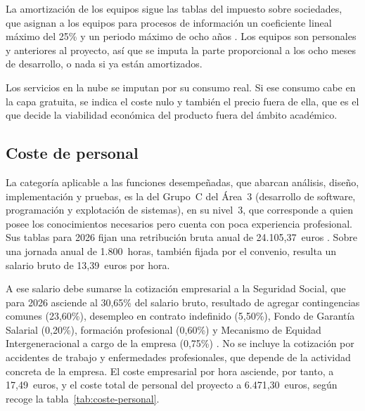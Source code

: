 La amortización de los equipos sigue las tablas del impuesto sobre sociedades, que asignan a los equipos para procesos de información un coeficiente lineal máximo del 25\% y un periodo máximo de ocho años \citep{LIS2014}. Los equipos son personales y anteriores al proyecto, así que se imputa la parte proporcional a los ocho meses de desarrollo, o nada si ya están amortizados.

Los servicios en la nube se imputan por su consumo real. Si ese consumo cabe en la capa gratuita, se indica el coste nulo y también el precio fuera de ella, que es el que decide la viabilidad económica del producto fuera del ámbito académico.

\subsection{Coste de personal}

La categoría aplicable a las funciones desempeñadas, que abarcan análisis, diseño, implementación y pruebas, es la del Grupo~C del Área~3 (desarrollo de software, programación y explotación de sistemas), en su nivel~3, que corresponde a quien posee los conocimientos necesarios pero cuenta con poca experiencia profesional. Sus tablas para 2026 fijan una retribución bruta anual de 24.105,37~euros \citep{ConvenioTIC2025}. Sobre una jornada anual de 1.800~horas, también fijada por el convenio, resulta un salario bruto de 13,39~euros por hora.

A ese salario debe sumarse la cotización empresarial a la Seguridad Social, que para 2026 asciende al 30,65\% del salario bruto, resultado de agregar contingencias comunes (23,60\%), desempleo en contrato indefinido (5,50\%), Fondo de Garantía Salarial (0,20\%), formación profesional (0,60\%) y Mecanismo de Equidad Intergeneracional a cargo de la empresa (0,75\%) \citep{OrdenCotizacion2026}. No se incluye la cotización por accidentes de trabajo y enfermedades profesionales, que depende de la actividad concreta de la empresa. El coste empresarial por hora asciende, por tanto, a 17,49~euros, y el coste total de personal del proyecto a 6.471,30~euros, según recoge la tabla~\ref{tab:coste-personal}.

